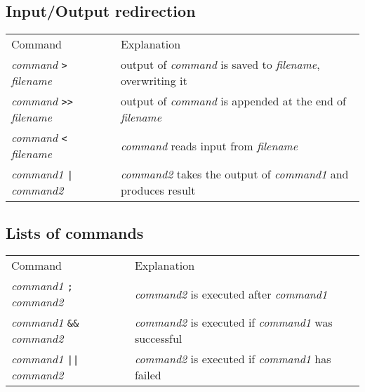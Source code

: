 \documentclass{article}
\begin{document}
\subsection{Input/Output redirection}
\begin{tabular}{ll}
  Command & Explanation \\
  \hhline{==}
  \textit{command} \texttt{>} \textit{filename} & output of \textit{command} is saved to \textit{filename}, overwriting it \\
  \textit{command} \texttt{>>} \textit{filename} & output of \textit{command} is appended at the end of \textit{filename} \\
  \textit{command} \texttt{<} \textit{filename} & \textit{command} reads input from \textit{filename} \\
  \textit{command1} \texttt{|} \textit{command2} & \textit{command2} takes the output of \textit{command1} and produces result \\  
\end{tabular}

\subsection{Lists of commands}
\begin{tabular}{ll}
  Command & Explanation \\
  \hhline{==}
  \textit{command1} \texttt{;} \textit{command2} & \textit{command2} is executed after \textit{command1}\\
  \textit{command1} \texttt{\&\&} \textit{command2} & \textit{command2} is executed if \textit{command1} was successful\\
  \textit{command1} \texttt{||} \textit{command2} & \textit{command2} is executed if \textit{command1} has failed\\
\end{tabular}
\end{document}
